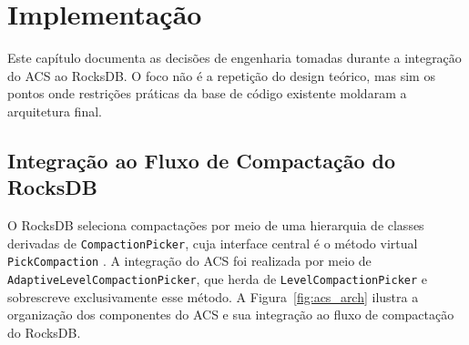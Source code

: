 \chapter{Implementação}\label{cap:implementacao}

Este capítulo documenta as decisões de engenharia tomadas durante a integração do
ACS ao RocksDB. O foco não é a repetição do design teórico, mas sim os pontos
onde restrições práticas da base de código existente moldaram a arquitetura final.

\section{Integração ao Fluxo de Compactação do RocksDB}

O RocksDB seleciona compactações por meio de uma hierarquia de classes derivadas
de \texttt{CompactionPicker}, cuja interface central é o método virtual
\texttt{PickCompaction} \cite{rocksdb_wiki}. A integração do ACS foi realizada por meio de
\texttt{AdaptiveLevelCompactionPicker}, que herda de \texttt{LevelCompactionPicker}
e sobrescreve exclusivamente esse método. A Figura~\ref{fig:acs_arch} ilustra a organização dos componentes do ACS e sua integração ao fluxo de compactação do RocksDB.

